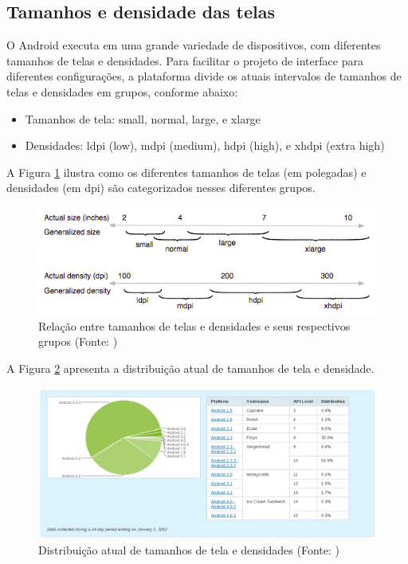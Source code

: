 \subsection{Tamanhos e densidade das telas}

O Android executa em uma grande variedade de dispositivos, com diferentes tamanhos
 de telas e densidades. Para facilitar o projeto de interface para diferentes 
 configurações, a plataforma divide os atuais intervalos de tamanhos de telas e
 densidades em grupos, conforme abaixo:
\begin{itemize}
    \item Tamanhos de tela: small, normal, large, e xlarge
    \item Densidades: ldpi (low), mdpi (medium), hdpi (high), e xhdpi (extra high)
\end{itemize}
 
A Figura \ref{intervalos_telas} ilustra como os diferentes tamanhos de telas 
(em polegadas) e 
densidades (em dpi) são categorizados nesses diferentes grupos.

\begin{figure}[h]
    \centering
    \includegraphics[width=15cm]{img/intervalos_telas}
    \caption[Relação entre tamanhos de telas e densidades e seus respectivos grupos]{Relação entre tamanhos de telas e densidades e seus respectivos grupos 
        (Fonte: \cite{sup_multi_screens}) }
    \label{intervalos_telas}
\end{figure}

A Figura \ref{distribuicao_telas} apresenta a distribuição atual de tamanhos 
de tela e densidade.

\begin{figure}[h]
    \centering
    \includegraphics[width=15cm]{img/api_level}
    \caption[Distribuição atual de tamanhos de tela e densidades]{Distribuição atual de tamanhos de tela e densidades (Fonte: \cite{sup_multi_screens})}
    \label{distribuicao_telas}
\end{figure}


